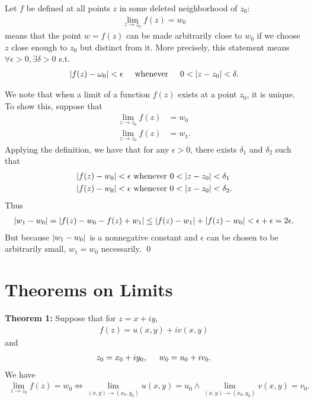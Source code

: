\documentclass{book}
\theoremstyle{definition}
\begin{document}
Let $f$ be defined at all points $z$ in some deleted neighborhood of $z_0$:
\begin{align}
\lim_{z\to z_0} f(z) = w_0
\end{align}
means that the point $w = f(z)$ can be made arbitrarily close to $w_0$ if we choose $z$ close enough to $z_0$ but distinct from it. More precisely, this statement means $\forall \epsilon >0, \exists \delta > 0 $ s.t. 
\begin{align}
\abs{f(z) - \omega_0} < \epsilon \hspace{0.5cm} \text{whenever} \hspace{0.5cm} 0 < \abs{z - z_0} < \delta.
\end{align}

We note that when a limit of a function $f(z)$ exists at a point $z_0$, it is unique. To show this, suppose that 
\begin{align}
\lim_{z \to z_0} f(z) &= w_0 \\
\lim_{z \to z_0} f(z) &= w_1.
\end{align} 
Applying the definition, we have that for any $\epsilon > 0$, there exists $\delta_1$ and $\delta_2$ such that
\begin{align}
&\abs{f(z) - w_0} < \epsilon \text{ whenever } 0 < \abs{z - z_0} < \delta_1 \\
&\abs{f(z) - w_0} < \epsilon \text{ whenever } 0 < \abs{z - z_0} < \delta_2.
\end{align}
Thus
\begin{align}
\abs{w_1 - w_0} = \abs{f(z) - w_0 - f(z) + w_1} \leq \abs{f(z) - w_1} + \abs{f(z) - w_0} < \epsilon + \epsilon  =2\epsilon.
\end{align}
But because $\abs{w_1 - w_0}$ is a nonnegative constant and $\epsilon$ can be chosen to be arbitrarily small, $w_1 = w_0$ necessarily. \qed





\section{Theorems on Limits}

\textbf{Theorem 1:} Suppose that for $z = x + iy$,
\begin{align}
f(z) = u(x,y) + iv(x,y)
\end{align}
and
\begin{align}
z_0 = x_0 + iy_0, \hspace{0.5cm} w_0 = u_0 + iv_0.
\end{align}
We have
\begin{align}
\lim_{z \to z_0}f(z) = w_0 \iff \lim_{(x,y)\to (x_0,y_0)} u(x,y) = u_0 \wedge \lim_{(x,y)\to (x_0,y_0)} v(x,y) = v_0.
\end{align}
\end{document}
